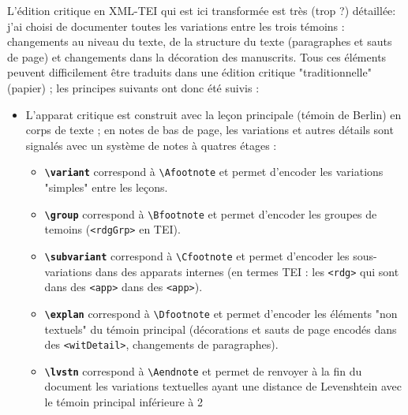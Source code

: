 \documentclass[12pt, a4paper]{article}
\begin{document}
            L'édition critique en XML-TEI qui est ici transformée est très (trop ?) 
            détaillée: j'ai choisi de documenter toutes les variations entre les trois 
            témoins : changements au niveau du texte, de la structure du texte 
            (paragraphes et sauts de page) et changements dans la décoration des 
            manuscrits. Tous ces éléments peuvent difficilement être traduits 
            dans une édition critique "traditionnelle" (papier) ; les principes 
            suivants ont donc été suivis :
            \begin{itemize}
            \item{L'apparat critique est construit avec la leçon principale (témoin de 
            Berlin) en corps de texte ; en notes de bas de page, les variations et 
            autres détails sont signalés avec un système de notes à quatres étages :}
            \begin{itemize}
                \item{\textbf{\texttt{\textbackslash variant}} correspond à 
                \texttt{\textbackslash Afootnote} et permet d'encoder les variations 
                "simples" entre les leçons.}
                \item{\textbf{\texttt{\textbackslash group}} correspond à 
                \texttt{\textbackslash Bfootnote} et permet d'encoder les groupes 
                de temoins (\texttt{<rdgGrp>} en TEI).}
                \item{\textbf{\texttt{\textbackslash subvariant}} correspond à 
                \texttt{\textbackslash Cfootnote} et permet d'encoder les sous-variations 
                dans des apparats internes (en termes TEI : les \texttt{<rdg>} 
                qui sont dans des \texttt{<app>} dans des \texttt{<app>}).}
                \item{\textbf{\texttt{\textbackslash explan}} correspond à 
                \texttt{\textbackslash Dfootnote} et permet d'encoder les éléments 
                "non textuels" du témoin principal (décorations et sauts de page 
                encodés dans des \texttt{<witDetail>}, changements de paragraphes).}
                \item{\textbf{\texttt{\textbackslash lvstn}} correspond à 
                \texttt{\textbackslash Aendnote} et permet de renvoyer à la fin du document
                les variations textuelles ayant une distance de Levenshtein avec le témoin
                principal inférieure à 2}
            \end{itemize}

\end{itemize}
\end{document}
